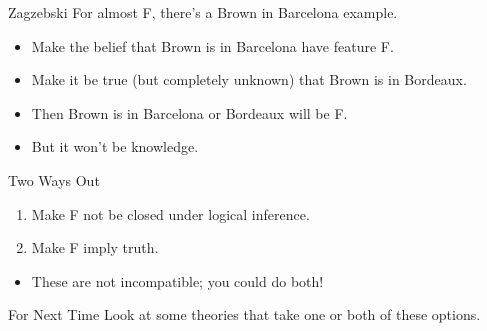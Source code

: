 \documentclass[
  17pt,
  letterpaper,
  ignorenonframetext,
  aspectratio=169,
]{beamer}
\providecommand{\tightlist}{%
  \setlength{\itemsep}{0pt}\setlength{\parskip}{0pt}}\usepackage{longtable,booktabs,array}
\begin{document}
\begin{frame}{Zagzebski}
\protect\hypertarget{zagzebski-1}{}
For almost F, there's a Brown in Barcelona example.

\begin{itemize}[<+->]
\tightlist
\item
  Make the belief that Brown is in Barcelona have feature F.
\item
  Make it be true (but completely unknown) that Brown is in Bordeaux.
\item
  Then Brown is in Barcelona or Bordeaux will be F.
\item
  But it won't be knowledge.
\end{itemize}
\end{frame}

\begin{frame}{Two Ways Out}
\protect\hypertarget{two-ways-out}{}
\begin{enumerate}[<+->]
\tightlist
\item
  Make F not be closed under logical inference.
\item
  Make F imply truth.
\end{enumerate}

\begin{itemize}[<+->]
\tightlist
\item
  These are not incompatible; you could do both!
\end{itemize}
\end{frame}

\begin{frame}{For Next Time}
\protect\hypertarget{for-next-time}{}
Look at some theories that take one or both of these options.
\end{frame}
\end{document}

